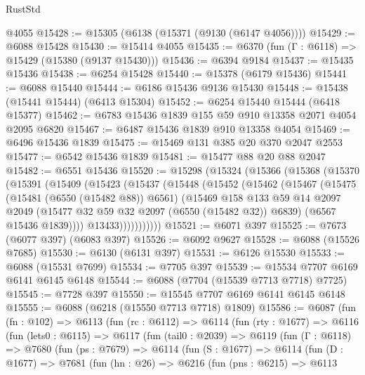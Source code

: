 \begin{lexlean}{RustStd}
\begin{coremodule}
    @4055
@15428 := @15305 (@6138 (@15371 (@9130 (@6147 @4056))))
@15429 := @6088 @15428
@15430 := @15414 @4055
@15435 := @6370 (fun (Γ : @6118) => @15429 (@15380 (@9137 @15430)))
@15436 := @6394 @9184
@15437 := @15435 @15436
@15438 := @6254 @15428
@15440 := @15378 (@6179 @15436)
@15441 := @6088 @15440
@15444 := @6186 @15436 @9136 @15430
@15448 := @15438 (@15441 @15444) (@6413 @15304)
@15452 := @6254 @15440 @15444 (@6418 @15377)
@15462 := @6783 @15436 @1839 @155 @59 @910 @13358 @2071 @4054 @2095 @6820
@15467 := @6487 @15436 @1839 @910 @13358 @4054
@15469 := @6496 @15436 @1839
@15475 := @15469 @131 @385 @20 @370 @2047 @2553
@15477 := @6542 @15436 @1839
@15481 := @15477 @88 @20 @88 @2047
@15482 := @6551 @15436
@15520 := @15298
    (@15324
      (@15366
        (@15368
          (@15370
            (@15391
              (@15409
                (@15423
                  (@15437
                    (@15448
                      (@15452
                        (@15462
                          (@15467
                            (@15475
                              (@15481 (@6550 (@15482 @88)) @6561)
                              (@15469
                                @158
                                @133
                                @59
                                @14
                                @2097
                                @2049
                                (@15477 @32 @59 @32 @2097 (@6550 (@15482 @32)) @6839)
                                (@6567 @15436 @1839))))
                          @13433)))))))))))
@15521 := @6071 @397
@15525 := @7673 (@6077 @397) (@6083 @397)
@15526 := @6092 @9627
@15528 := @6088 (@15526 @7685)
@15530 := @6130 (@6131 @397)
@15531 := @6126 @15530
@15533 := @6088 (@15531 @7699)
@15534 := @7705 @397
@15539 := @15534 @7707 @6169 @6141 @6145 @6148
@15544 := @6088 (@7704 (@15539 @7713 @7718) @7725)
@15545 := @7728 @397
@15550 := @15545 @7707 @6169 @6141 @6145 @6148
@15555 := @6088 (@6218 (@15550 @7713 @7718) @1809)
@15586 := @6087
    (fun (fn : @102) =>
    @6113
      (fun (rc : @6112) =>
      @6114
        (fun (rty : @1677) =>
        @6116
          (fun (lets0 : @6115) =>
          @6117
            (fun (tail0 : @2039) =>
            @6119
              (fun (Γ : @6118) =>
              @7680
                (fun (ps : @7679) =>
                @6114
                  (fun (S : @1677) =>
                  @6114
                    (fun (D : @1677) =>
                    @7681
                      (fun (hn : @26) =>
                      @6216
                        (fun (pns : @6215) =>
                        @6113

\end{coremodule}
\end{lexlean}
